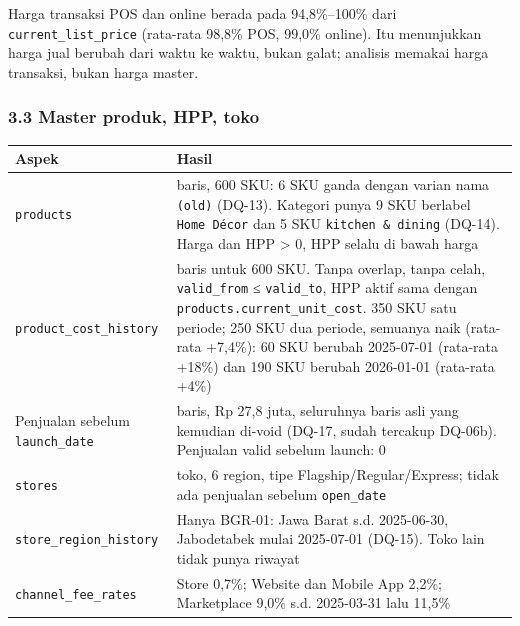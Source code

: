\documentclass[10pt,a4paper]{article}
\begin{document}
Harga transaksi POS dan online berada pada 94,8\%--100\% dari \texttt{current\_\allowbreak{}list\_\allowbreak{}price} (rata-rata 98,8\% POS,
99,0\% online). Itu menunjukkan harga jual berubah dari waktu ke waktu, bukan galat; analisis memakai
harga transaksi, bukan harga master.

\subsubsection{3.3 Master produk, HPP, toko}\label{master-produk-hpp-toko}

{\def\LTcaptype{none} %
\begin{longtable}[]{@{}
  >{\raggedright\arraybackslash}p{}
  >{\raggedright\arraybackslash}p{}@{}}
\toprule\noalign{}
\begin{minipage}[b]{\linewidth}\raggedright
Aspek
\end{minipage} & \begin{minipage}[b]{\linewidth}\raggedright
Hasil
\end{minipage} \\
\midrule\noalign{}
\endhead
\bottomrule\noalign{}
\endlastfoot
\texttt{products} & 606 baris, 600 SKU: 6 SKU ganda dengan varian nama \texttt{(old)} (DQ-13). Kategori punya 9 SKU berlabel \texttt{Home\ Décor} dan 5 SKU \texttt{kitchen\ \&\ dining} (DQ-14). Harga dan HPP \textgreater{} 0, HPP selalu di bawah harga \\
\texttt{product\_\allowbreak{}cost\_\allowbreak{}history} & 850 baris untuk 600 SKU. Tanpa overlap, tanpa celah, \texttt{valid\_\allowbreak{}from} ≤ \texttt{valid\_\allowbreak{}to}, HPP aktif sama dengan \texttt{products.current\_\allowbreak{}unit\_\allowbreak{}cost}. 350 SKU satu periode; 250 SKU dua periode, semuanya naik (rata-rata +7,4\%): 60 SKU berubah 2025-07-01 (rata-rata +18\%) dan 190 SKU berubah 2026-01-01 (rata-rata +4\%) \\
Penjualan sebelum \texttt{launch\_\allowbreak{}date} & 126 baris, Rp 27,8 juta, seluruhnya baris asli yang kemudian di-void (DQ-17, sudah tercakup DQ-06b). Penjualan valid sebelum launch: 0 \\
\texttt{stores} & 18 toko, 6 region, tipe Flagship/Regular/Express; tidak ada penjualan sebelum \texttt{open\_\allowbreak{}date} \\
\texttt{store\_\allowbreak{}region\_\allowbreak{}history} & Hanya BGR-01: Jawa Barat s.d. 2025-06-30, Jabodetabek mulai 2025-07-01 (DQ-15). Toko lain tidak punya riwayat \\
\texttt{channel\_\allowbreak{}fee\_\allowbreak{}rates} & Store 0,7\%; Website dan Mobile App 2,2\%; Marketplace 9,0\% s.d. 2025-03-31 lalu 11,5\% \\
\end{longtable}
}
\end{document}

